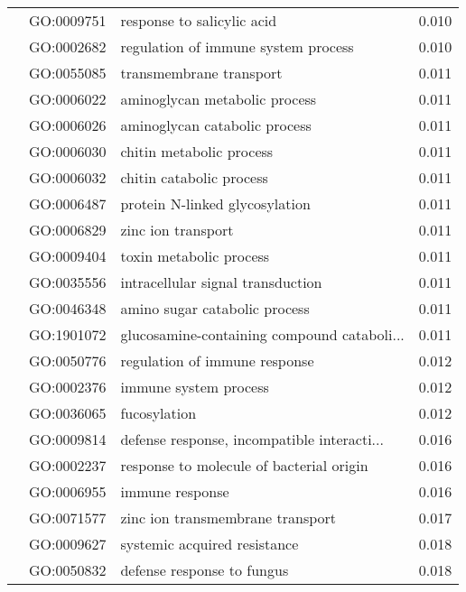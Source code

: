 \begin{longtable}{lllr}
   & GO:0009751 &                   response to salicylic acid &         0.010 \\
   & GO:0002682 &          regulation of immune system process &         0.010 \\
   & GO:0055085 &                      transmembrane transport &         0.011 \\
   & GO:0006022 &                aminoglycan metabolic process &         0.011 \\
   & GO:0006026 &                aminoglycan catabolic process &         0.011 \\
   & GO:0006030 &                     chitin metabolic process &         0.011 \\
   & GO:0006032 &                     chitin catabolic process &         0.011 \\
   & GO:0006487 &               protein N-linked glycosylation &         0.011 \\
   & GO:0006829 &                           zinc ion transport &         0.011 \\
   & GO:0009404 &                      toxin metabolic process &         0.011 \\
   & GO:0035556 &            intracellular signal transduction &         0.011 \\
   & GO:0046348 &                amino sugar catabolic process &         0.011 \\
   & GO:1901072 &  glucosamine-containing compound cataboli... &         0.011 \\
   & GO:0050776 &                regulation of immune response &         0.012 \\
   & GO:0002376 &                        immune system process &         0.012 \\
   & GO:0036065 &                                 fucosylation &         0.012 \\
   & GO:0009814 &  defense response, incompatible interacti... &         0.016 \\
   & GO:0002237 &     response to molecule of bacterial origin &         0.016 \\
   & GO:0006955 &                              immune response &         0.016 \\
   & GO:0071577 &             zinc ion transmembrane transport &         0.017 \\
   & GO:0009627 &                 systemic acquired resistance &         0.018 \\
   & GO:0050832 &                   defense response to fungus &         0.018 \\

\end{longtable}

